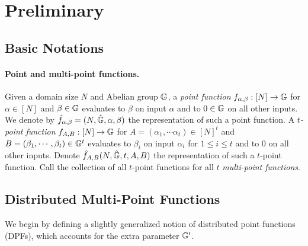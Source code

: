 \section{Preliminary}

\subsection{Basic Notations}



 \paragraph{Point and multi-point functions.} Given a domain size $N$ and Abelian group $\mathbb{G}$, a \emph{point function} $f_{\alpha,\beta}:[N]\rightarrow\mathbb{G}$ for $\alpha\in[N]$ and $\beta\in\mathbb{G}$ evaluates to $\beta$ on input $\alpha$ and to $0\in\mathbb{G}$ on all other inputs. We denote by $\hat{f}_{\alpha,\beta}=(N,\hat{\mathbb{G}},\alpha,\beta)$ the representation of such a point function. A \emph{$t$-point function} $f_{A,B}:[N]\rightarrow \mathbb{G}$ for $A=(\alpha_1,\cdots\alpha_t)\in[N]^t$ and $B=(\beta_1,\cdots,\beta_t)\in \mathbb{G}^t$ evaluates to $\beta_i$ on input $\alpha_i$ for $1\le i\le t$ and to $0$ on all other inputs. Denote $\hat{f}_{A,B}(N,\hat{\mathbb{G}},t,A,B)$ the representation of such a $t$-point function. Call the collection of all $t$-point functions for all $t$ \emph{multi-point functions}. 
 
 
\subsection{Distributed Multi-Point Functions}


We begin by defining a slightly generalized notion of distributed point functions (DPFs), which accounts for the extra parameter $\mathbb{G}'$. 


